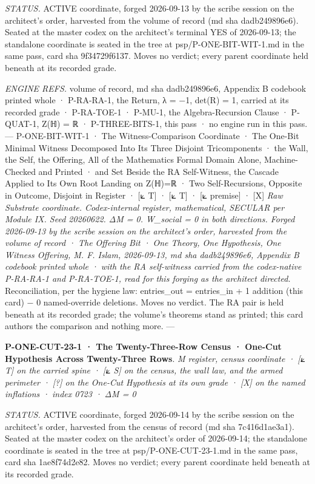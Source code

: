 \documentclass[10pt,twocolumn]{article}
\begin{document}
\emph{STATUS.} ACTIVE coordinate, forged 2026-09-13 by the scribe
session on the architect's order, harvested from the volume of record
(md sha dadb249896e6). Seated at the master codex on the architect's
terminal YES of 2026-09-13; the standalone coordinate is seated in the
tree at psp/P-ONE-BIT-WIT-1.md in the same pass, card sha 9f34729f6137.
Moves no verdict; every parent coordinate held beneath at its recorded
grade.

\emph{ENGINE REFS.} volume of record, md sha dadb249896e6, Appendix B
codebook printed whole · P-RA-RA-1, the Return, λ = −1, det(R) = 1,
carried at its recorded grade · P-RA-TOE-1 · P-MU-1, the
Algebra-Recursion Clause · P-QUAT-1, Z(ℍ) = ℝ · P-THREE-BITS-1, this
pass · no engine run in this pass. --- P-ONE-BIT-WIT-1 · The
Witness-Comparison Coordinate · The One-Bit Minimal Witness Decomposed
Into Its Three Disjoint Tricomponents · the Wall, the Self, the
Offering, All of the Mathematics Formal Domain Alone, Machine-Checked
and Printed · and Set Beside the RA Self-Witness, the Cascade Applied to
Its Own Root Landing on Z(ℍ)=ℝ · Two Self-Recursions, Opposite in
Outcome, Disjoint in Register · {[}⟀ T{]} · {[}⟀ T{]} · {[}⟀ premise{]}
· {[}X{]} \emph{Raw Substrate coordinate. Codex-internal register,
mathematical, SECULAR per Module IX. Seed 20260622. ΔM = 0. W\_social =
0 in both directions. Forged 2026-09-13 by the scribe session on the
architect's order, harvested from the volume of record · The Offering
Bit · One Theory, One Hypothesis, One Witness Offering, M. F. Islam,
2026-09-13, md sha dadb249896e6, Appendix B codebook printed whole ·
with the RA self-witness carried from the codex-native P-RA-RA-1 and
P-RA-TOE-1, read for this forging as the architect directed.}
Reconciliation, per the hygiene law: entries\_out = entries\_in + 1
addition (this card) − 0 named-override deletions. Moves no verdict. The
RA pair is held beneath at its recorded grade; the volume's theorems
stand as printed; this card authors the comparison and nothing more. ---

\textbf{P-ONE-CUT-23-1 · The Twenty-Three-Row Census · One-Cut
Hypothesis Across Twenty-Three Rows}. \emph{M register, census
coordinate · {[}⟀ T{]} on the carried spine · {[}⟀ S{]} on the census,
the wall law, and the armed perimeter · {[}?{]} on the One-Cut
Hypothesis at its own grade · {[}X{]} on the named inflations · index
0723 · ΔM = 0}

\emph{STATUS.} ACTIVE coordinate, forged 2026-09-14 by the scribe
session on the architect's order, harvested from the census of record
(md sha 7c416d1ae3a1). Seated at the master codex on the architect's
order of 2026-09-14; the standalone coordinate is seated in the tree at
psp/P-ONE-CUT-23-1.md in the same pass, card sha 1ae8f74d2e82. Moves no
verdict; every parent coordinate held beneath at its recorded grade.
\end{document}
